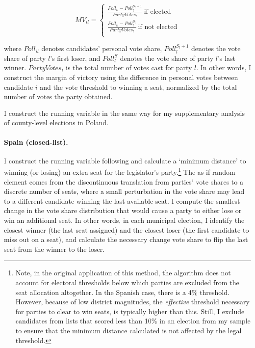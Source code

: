 \documentclass[12pt]{article}
\begin{document}
\begin{equation}
MV_{il} = \begin{cases}
\frac{Poll_{il} - Poll_{l}^{S_l + 1}}{PartyVotes_l} \ \text{if elected} \\
\frac{Poll_{il} - Poll_{l}^{S_l}}{PartyVotes_l} \ \text{if not elected} \\
\end{cases}
\end{equation}

where $Poll_{il}$ denotes candidates' personal vote share, $Poll_l^{S_l + 1}$ denotes the vote share of party $l$'s first loser, and $Poll_l^S$ denotes the vote share of party $l$'s last winner. $PartyVotes_l$ is the total number of votes cast for party $l$. In other words, I construct the margin of victory  using the difference in personal votes between candidate $i$ and the vote threshold to winning a seat, normalized by the total number of votes the party obtained.

I construct the running variable in the same way for my supplementary analysis of county-level elections in Poland.

\paragraph*{Spain (closed-list).} I construct the running variable following \cite{folke2014} and calculate a `minimum distance' to winning (or losing) an extra seat for the legislator's party.\footnote{Note, in the original application of this method, the algorithm does not account for electoral thresholds below which parties are excluded from the seat allocation altogether. In the Spanish case, there is a 4\% threshold. However, because of low district magnitudes, the \emph{effective} threshold necessary for parties to clear to win seats, is typically higher than this. Still, I exclude candidates from lists that scored less than 10\% in an election from my sample to ensure that the minimum distance calculated is not affected by the legal threshold.} The as-if random element comes from the discontinuous translation from parties' vote shares to a discrete number of seats, where a small perturbation in the vote share may lead to a different candidate winning the last available seat. I compute the smallest change in the vote share distribution that would cause a party to either lose or win an additional seat. In other words, in each municipal election, I identify the closest winner (the last seat assigned) and the closest loser (the first candidate to miss out on a seat), and calculate the necessary change vote share to flip the last seat from the winner to the loser.
\end{document}
